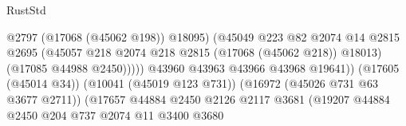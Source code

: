 \begin{lexlean}{RustStd}
\begin{coremodule}
                                                            @2797
                                                            (@17068 (@45062 @198))
                                                            @18095)
                                                          (@45049
                                                            @223
                                                            @82
                                                            @2074
                                                            @14
                                                            @2815
                                                            @2695
                                                            (@45057
                                                              @218
                                                              @2074
                                                              @218
                                                              @2815
                                                              (@17068 (@45062 @218))
                                                              @18013)
                                                            (@17085 @44988 @2450)))))
                                                    @43960
                                                    @43963
                                                    @43966
                                                    @43968
                                                    @19641))
                                                (@17605 (@45014 @34))
                                                (@10041 (@45019 @123 @731))
                                                (@16972 (@45026 @731 @63 @3677 @2711))
                                                (@17657
                                                  @44884
                                                  @2450
                                                  @2126
                                                  @2117
                                                  @3681
                                                  (@19207
                                                    @44884
                                                    @2450
                                                    @204
                                                    @737
                                                    @2074
                                                    @11
                                                    @3400
                                                    @3680

\end{coremodule}
\end{lexlean}
